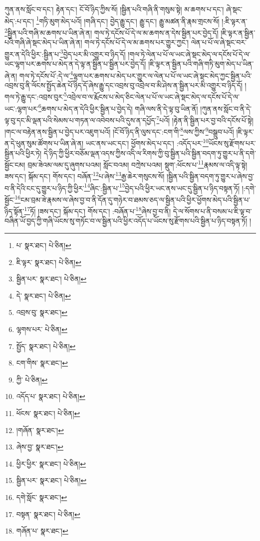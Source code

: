 ཀུན་ནས་སློང་བ་དང་། རྟེན་དང་། ངོ་བོ་ཉིད་ཀྱིས་སོ། །སྦྱིན་པའི་གཞི་ནི་གསུམ་སྟེ། མ་ཆགས་པ་དང་། ཞེ་སྡང་མེད་:པ་དང་། \footnote{པ་  སྣར་ཐང་།  པེ་ཅིན། }གཏི་མུག་མེད་པའོ། །གཞི་དང་། བྱེད་རྒྱུ་དང་། རྒྱུ་དང་། རྒྱུ་མཚན་ནི་རྣམ་གྲངས་སོ། །:ཇི་ལྟར་ན་\footnote{ཇི་ལྟར་  སྣར་ཐང་།  པེ་ཅིན། }སྦྱིན་པའི་གཞི་མ་ཆགས་པ་ཡིན་ཞེ་ན། གལ་ཏེ་དངོས་པོ་དེ་ལ་མ་ཆགས་ན་དེས་སྦྱིན་པར་བྱེད་དོ། །ཇི་ལྟར་ན་སྦྱིན་པའི་གཞི་ཞེ་སྡང་མེད་པ་ཡིན་ཞེ་ན། གལ་ཏེ་དངོས་པོ་དེ་ལ་མ་ཆགས་པར་གྱུར་ཀྱང་། ལེན་པ་པོ་ལ་ཞེ་སྡང་བར་གྱུར་ན་དེའི་ཕྱིར་:སྦྱིན་པ་\footnote{སྦྱིན་པར་  སྣར་ཐང་།  པེ་ཅིན། }བྱེད་པར་མི་འགྱུར་བ་ཉིད་དོ། །གལ་ཏེ་ལེན་པ་པོ་ལ་ཡང་ཞེ་སྡང་མེད་ལ་དངོས་པོ་དེ་ལ་ཡང་ལྷག་པར་ཆགས་པ་མེད་ན་དེ་ལྟ་ན་སྦྱིན་པ་སྦྱིན་པར་བྱེད་དོ། །ཇི་ལྟར་ན་སྦྱིན་པའི་གཞི་གཏི་མུག་མེད་པ་ཡིན་ཞེ་ན། གལ་ཏེ་དངོས་པོ་:དེ་ལ་\footnote{དེ་  སྣར་ཐང་།  པེ་ཅིན། }ལྷག་པར་ཆགས་པ་མེད་པར་གྱུར་ལ་ལེན་པ་པོ་ལ་ཡང་ཞེ་སྡང་མེད་ཀྱང་སྦྱིན་པའི་འབྲས་བུ་ནི་ལོངས་སྤྱོད་ཆེན་པོ་ཉིད་དོ་ཞེས་རྒྱུ་དང་འབྲས་བུ་འབྲེལ་བ་མི་ཤེས་ན་སྦྱིན་པར་མི་འགྱུར་བ་ཉིད་དོ། །གལ་ཏེ་རྒྱུ་དང་:འབྲས་བུར་\footnote{འབྲས་བུ་  སྣར་ཐང་། }འབྲེལ་བ་ལ་རྨོངས་པ་མེད་ཅིང་ལེན་པ་པོ་ལ་ཡང་ཞེ་སྡང་མེད་ལ་དངོས་པོ་དེ་ལ་ཡང་:ལྷག་པར་\footnote{ལྷགས་པར་  པེ་ཅིན། }ཆགས་པ་མེད་ན་དེའི་ཕྱིར་སྦྱིན་པ་བྱེད་དེ། གཞི་ལས་ནི་དེ་ལྟ་བུ་ཡིན་ནོ། །ཀུན་ནས་སློང་བ་ནི་དེ་ལྟ་བུ་དང་མི་ལྡན་པའི་སེམས་པ་གཏན་ལ་འབེབས་པའི་དུས་ན་དཔྱོད་\footnote{སྤྱོད་  སྣར་ཐང་།  པེ་ཅིན། }པའོ། །རྟེན་ནི་སྦྱིན་པར་བྱ་བའི་དངོས་པོ་སྟེ། །གང་ལ་བརྟེན་ནས་སྦྱིན་པ་བྱེད་པར་འཇུག་པའོ། །ངོ་བོ་ཉིད་ནི་ལུས་དང་:ངག་གི་\footnote{ངག་གིས་  སྣར་ཐང་། }ལས་ཀྱིས་\footnote{ཀྱི་  པེ་ཅིན། }བསྒྲུབ་པའོ། །ཇི་ལྟར་ན་དེ་ཕུན་སུམ་ཚོགས་པ་ཡིན་ཞེ་ན། ཡང་ནས་ཡང་དང་། ཕྱོགས་མེད་པ་དང་། :འདོད་པར་\footnote{འདོད་པ་  སྣར་ཐང་།  པེ་ཅིན། }ཡོངས་སུ་རྫོགས་པར་སྦྱིན་པའི་ཕྱིར་ཏེ། དེ་ཉིད་ཀྱི་ཕྱིར་བཅོམ་ལྡན་འདས་ཀྱིས་འདི་ལ་རིགས་ཀྱི་བུ་སྦྱིན་པའི་སྦྱིན་བདག་ཏུ་གྱུར་པ་ནི་དགེ་སྦྱོང་ངམ། བྲམ་ཟེའམ་ལམ་དུ་ཞུགས་པའམ། སློང་བའམ། བཀྲེས་པའམ། སྡུག་:ཕོངས་པ་\footnote{ཕོངས་  སྣར་ཐང་།  པེ་ཅིན། }རྣམས་ལ་འདི་ལྟ་སྟེ། ཟས་དང་། སྐོམ་དང་། གོས་དང་། བཞོན་\footnote{།གཞོན་  སྣར་ཐང་། }པ་ཞེས་\footnote{ཞེས་བྱ་  སྣར་ཐང་། }རྒྱ་ཆེར་གསུངས་སོ། །སྦྱིན་པའི་སྦྱིན་བདག་ཏུ་གྱུར་པ་ཞེས་བྱ་བ་ནི་དེའི་ངང་དུ་གྱུར་པ་ཉིད་ཀྱི་ཕྱིར་\footnote{ཕྱིར་ཕྱིར་  སྣར་ཐང་།  པེ་ཅིན། }ཞིང་:སྦྱིན་པ་\footnote{སྦྱིན་པར་  སྣར་ཐང་།  པེ་ཅིན། }བྱེད་པའི་ཕྱིར་ཡང་ནས་ཡང་དུ་སྦྱིན་པ་ཉིད་བསྟན་ཏོ། །:དགེ་སྦྱོང་\footnote{དགེ་སློང་  སྣར་ཐང་། }ངམ་བྲམ་ཟེ་རྣམས་ལ་ཞེས་བྱ་བ་ནི་དོན་དུ་གཉེར་བ་ཐམས་ཅད་ལ་སྦྱིན་པའི་ཕྱིར་ཕྱོགས་མེད་པའི་སྦྱིན་པ་ཉིད་སྟོན་\footnote{བསྟན་  སྣར་ཐང་།  པེ་ཅིན། }ཏོ། །ཟས་དང་། སྐོམ་དང་། གོས་དང་། :བཞོན་པ་\footnote{གཞོན་པ་  སྣར་ཐང་། }ཞེས་བྱ་བ་ནི། དེ་ལ་སོགས་པ་ནི་བསམ་པ་ཇི་ལྟ་བ་བཞིན་ཡོ་བྱད་ཀྱི་གཞི་ཡོངས་སུ་གཏོང་བ་ལ་སྦྱིན་པའི་ཕྱིར་འདོད་པ་ཡོངས་སུ་རྫོགས་པའི་སྦྱིན་པ་ཉིད་བསྟན་ཏོ། །
